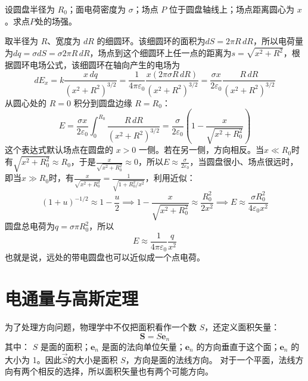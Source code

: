 \documentclass[lang=cn,11pt]{elegantbook}
\begin{document}
\begin{exercise}
设圆盘半径为 \(R_0\)；面电荷密度为 \(\sigma\)；场点 \(P\) 位于圆盘轴线上；场点距离圆心为 \(x\)。求点$P$处的场强。
\end{exercise}
\begin{solution}
取半径为 \(R\)、宽度为 \(dR\) 的细圆环。该细圆环的面积为\(dS=2\pi R\,dR\)，所以电荷量为\(dq=\sigma dS
=\sigma 2\pi R\,dR\)，场点到这个细圆环上任一点的距离为\(s=\sqrt{x^2+R^2}\)，根据圆环电场公式，该细圆环在轴向产生的电场为\[dE_x=k\frac{x\,dq}{(x^2+R^2)^{3/2}}=\frac{1}{4\pi\varepsilon_0}\frac{x(2\pi\sigma R\,dR)}{(x^2+R^2)^{3/2}}=\frac{\sigma x}{2\varepsilon_0}\frac{R\,dR}{(x^2+R^2)^{3/2}}
\]从圆心处的 \(R=0\) 积分到圆盘边缘 \(R=R_0\)：
\[E=\frac{\sigma x}{2\varepsilon_0}\int_0^{R_0}\frac{R\,dR}{(x^2+R^2)^{3/2}}=\frac{\sigma}{2\varepsilon_0}\left(1-\frac{x}{\sqrt{x^2+R_0^2}}\right)\]这个表达式默认场点在圆盘的 \(x>0\) 一侧。若在另一侧，方向相反。当\(x\ll R_0\)时有\(\sqrt{x^2+R_0^2}\approx R_0\)，于是\(\frac{x}{\sqrt{x^2+R_0^2}}\approx0\)，所以\(E\approx\frac{\sigma}{2\varepsilon_0}\)，当圆盘很小、场点很远时，即当\(x\gg R_0\)时，有\(\frac{x}{\sqrt{x^2+R_0^2}}=\frac{1}{\sqrt{1+R_0^2/x^2}}\)，利用近似：
\[(1+u)^{-1/2}\approx1-\frac u2\implies 1-\frac{x}{\sqrt{x^2+R_0^2}}\approx\frac{R_0^2}{2x^2}
\implies E\approx\frac{\sigma R_0^2}{4\varepsilon_0x^2}\]
圆盘总电荷为\(q=\sigma\pi R_0^2\)，所以\[
\boxed{
E\approx
\frac{1}{4\pi\varepsilon_0}
\frac{q}{x^2}
}
\]也就是说，远处的带电圆盘也可以近似成一个点电荷。
\end{solution}

\section{电通量与高斯定理}

\begin{definition}[面积矢量]
  为了处理方向问题，物理学中不仅把面积看作一个数 \(S\)，还定义面积矢量：
\[
\boxed{\mathbf S=S\mathbf e_n}
\]其中：
\(S\) 是面的面积；\(\mathbf e_n\) 是面的法向单位矢量；\(\mathbf e_n\) 的方向垂直于这个面；\(\mathbf e_n\) 的大小为 1。因此$\vec{S}$的大小是面积 \(S\)，方向是面的法线方向。
对于一个平面，法线方向有两个相反的选择，所以面积矢量也有两个可能方向。
\end{definition}
\end{document}
